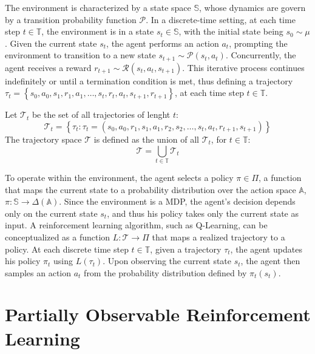 \documentclass[12pt]{article}
\begin{document}
The environment is characterized by a state space $\mathbb{S}$, whose dynamics are govern by a transition probability function $\mathcal{P}$. In a discrete-time setting, at each time step $t \in \mathbb{T}$, the environment is in a state $s_{t} \in \mathbb{S}$, with the initial state being $s_{0} \sim \mu$. Given the current state $s_{t}$, the agent performs an action $a_{t}$, prompting the environment to transition to a new state $s_{t+1} \sim \mathcal{P}(s_{t},a_{t})$. Concurrently, the agent receives a reward $r_{t+1} \sim \mathcal{R}(s_{t},a_{t},s_{t+1})$. This iterative process continues indefinitely or until a termination condition is met, thus defining a trajectory $\tau_{t} = \left\{s_{0},a_{0}, s_{1},r_{1},a_{1},\dots,s_{t},r_{t},a_{t},s_{t+1},r_{t+1} \right\}$, at each time step $t \in \mathbb{T}$.

Let $\mathcal{T}_{t}$ be the set of all trajectories of lenght $t$:
\begin{equation*}
	\mathcal{T}_{t} = \left\{\tau_{t} : \tau_{t}=(s_{0},a_{0},r_{1},s_{1},a_{1},r_{2},s_{2},\dots,s_{t},a_{t},r_{t+1},s_{t+1})\right\}
\end{equation*}
The trajectory space $\mathcal{T}$ is defined as the union of all $\mathcal{T}_{t}$, for $t \in \mathbb{T}$:
\begin{equation*}
	\mathcal{T} = \bigcup_{t \in \mathbb{T}} \mathcal{T}_{t}
\end{equation*}

To operate within the environment, the agent selects a policy $\pi \in \Pi$, a function that maps the current state to a probability distribution over the action space $\mathbb{A}$, $\pi: \mathbb{S} \to \Delta(\mathbb{A})$. Since the environment is a MDP, the agent's decision depends only on the current state $s_{t}$, and thus his policy takes only the current state as input. A reinforcement learning algorithm, such as Q-Learning, can be conceptualized as a function $L: \mathcal{T} \to \Pi$ that maps a realized trajectory to a policy. At each discrete time step $t \in \mathbb{T}$, given a trajectory $\tau_{t}$, the agent updates his policy $\pi_{t}$ using $L(\tau_{t})$. Upon observing the current state $s_{t}$, the agent then samples an action $a_{t}$ from the probability distribution defined by $\pi_{t}(s_{t})$.

\section{Partially Observable Reinforcement Learning}
\end{document}
